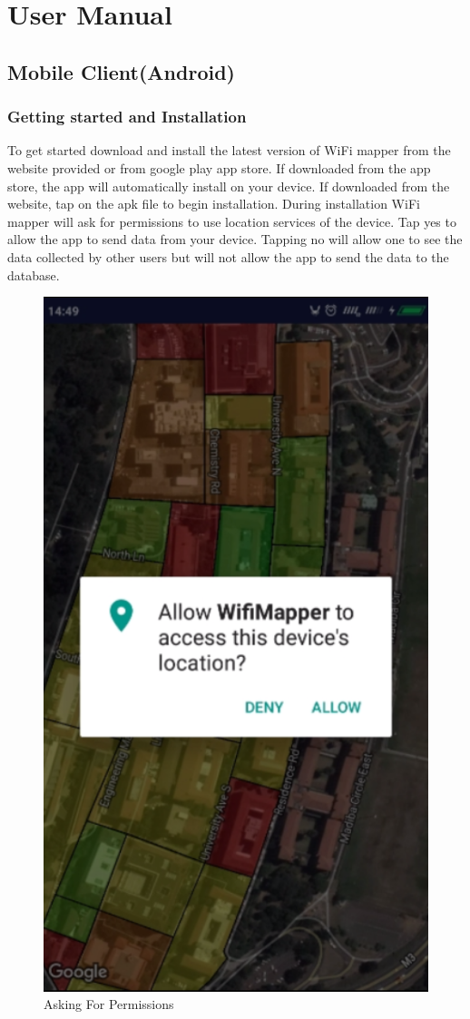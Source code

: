 \section{User Manual}
\label{ss:user-manual}

\subsection{Mobile Client(Android)}
\subsubsection{Getting started and Installation}
To get started download and install the latest version of WiFi mapper from the website provided or from google play app store. If downloaded from the app store, the app will automatically install on your device. If downloaded from the website, tap on the apk file to begin installation. During installation WiFi mapper will ask for permissions to  use location services of the device. Tap yes to allow the app to send data from your device. Tapping no will allow one to see the data collected by other users but will not allow the app to send the data to the database.
\begin{figure}
	\centering
	\includegraphics[width=0.7\linewidth]{images_manual/permissions}
	\caption{Asking For Permissions}
	\label{fig:permissions}
\end{figure}


